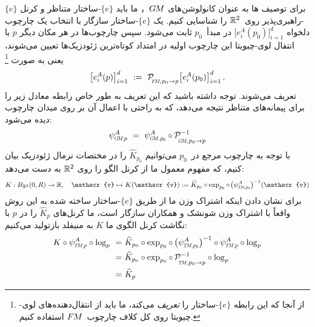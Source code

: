 برای توصیف ها به عنوان کانولوشن‌های $G\mkern-1.4muM$， ما باید $\{e\}$-ساختار متناظر و کرنل $\{e\}$-راهبری‌پذیر روی~$\mathbb{R}^2$ را شناسایی کنیم.
یک $\{e\}$-ساختار سازگار با انتخاب یک چارچوب دلخواه $\big[e^A_i(p_0)\big]_{i=1}^d$ در مبدأ~$p_0$ ثابت می‌شود.
سپس چارچوب‌ها در هر مکان دیگر $p$ با انتقال لوی-چیویتا این چارچوب اولیه در امتداد کوتاه‌ترین ژئودزیک‌ها تعیین می‌شوند، یعنی به صورت%
\footnote{
    از آنجا که این رابطه $\{e\}$-ساختار را \emph{تعریف} می‌کند، ما باید از انتقال‌دهنده‌های لوی-چیویتا روی کل کلاف چارچوب~$F\mkern-1.5muM$ استفاده کنیم.
}
\begin{align}
    \big[e^A_i(p) \big]_{i=1}^d\ :=\ 
    \mathcal{P}_{\mkern-2mu\overset{}{\protect\scalebox{.6}{$\!F\!M$}\mkern-2mu,\mkern1mu p_0\to p}}
    \big[e^A_i(p_0)\big]_{i=1}^d \,.
\end{align}
تعریف می‌شوند. توجه داشته باشید که این تعریف به طور خاص رابطه معادل زیر را برای پیمانه‌های متناظر نتیجه می‌دهد، که به راحتی با اعمال آن بر روی میدان چارچوب دیده می‌شود:
\begin{align}\label{eq:PTC_e-structure_gauges}
    \psiGMp^A
    \ =\ 
    \psi_{\protect\scalebox{.6}{$G\!M,\mkern2mu$}\protect\scalebox{.7}{$p_0$}}^A
    \circ
    \mathcal{P}_{\mkern-2mu\overset{}{\protect\scalebox{.6}{$\!G\!M$}\mkern-2mu,\mkern1mu p_0\to p}}^{-1}
\end{align}
با توجه به چارچوب مرجع در~$p_0$ می‌توانیم $\widehat{K}_{p_0}$ را در مختصات نرمال ژئودزیک بیان کنیم، که مفهوم معمول ما از کرنل الگو را روی $\mathbb{R}^2$ به دست می‌دهد:
\begin{align}\label{eq:PTCs_kernel_lift_R2}
    K: B_{\R^2}(0,R) \to \R,
    \quad \mathscr{v} \mapsto K(\mathscr{v}) :=
    \widehat{K}_{p_0} \circ \exp_{p_0} \circ\mkern2mu
    \big( \psi_{\protect\scalebox{.6}{$T\!M,$}\protect\scalebox{.7}{$p_0$}}^A \big)^{-1} (\mathscr{v})
\end{align}
برای نشان دادن اینکه اشتراک وزن ما از طریق $\{e\}$-ساختار ساخته شده به این روش واقعاً با اشتراک وزن شونشک و همکاران\cite{schonsheck2018parallel} سازگار است، ما کرنل‌های $\widehat{K}_p$ را در $p$ با نگاشت کرنل الگوی ما $K$ به منیفلد بازتولید می‌کنیم:
\begin{align}
    K \circ \psiTMp^A \circ \log_p
    \ =&\ \widehat{K}_{p_0} \circ \exp_{p_0} \circ\,
        \big( \psi_{\protect\scalebox{.6}{$T\!M,$}\protect\scalebox{.7}{$p_0$}}^A \big)^{-1}
        \circ \psiTMp^A \circ \log_p \notag \\
    \ =&\ \widehat{K}_{p_0} \circ \exp_{p_0} \circ\,
        \mathcal{P}_{\mkern-2mu\overset{}{\protect\scalebox{.6}{$\!T\!M$}\mkern-2mu,\mkern1mu p_0\to p}}^{-1}
        \circ \log_p \notag \\
    \ =&\ \widehat{K}_p
\end{align}
